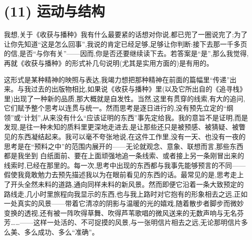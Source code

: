 \section{(11) 运动与结构}

我想,关于《收获与播种》我有什么最要紧的话想对你说,都已兜了一圈说完了;为了让你先知道“这是怎么回事”,我说的肯定已经足够,足够让你判断:接下去那一千多页的信,是否“与你有关”——因而,你是否还要继续读下去。若答案是“是”,那么我觉得,再就《收获与播种》的形式补几句说明(尤其是实用方面的)是有用的。

这形式是某种精神的映照与表达,我竭力想把那种精神在前面的篇幅里“传递”出来。与我过去的出版物相比,如果说《收获与播种》里(以及它所出自的《追寻栈》里)出现了一种新的品质,那大概就是自发性。当然,这里有贯穿的线索,有大的追问,它们赋予整个思考以连贯与统一。然而思考是逐日进行的,没有预先立定的“纲领”或“计划”,从来没有什么“应该证明的东西”事先定给我。我的意旨不是证明,而是发现,是往一种未知的质料里更深地走进去,是让那些还只是被预感、被猜疑、被瞥见的东西凝结起来。我可以毫不夸张地说,在这件工作里,没有一天、也没有一夜的思考是在“预料之中”的范围内展开的——无论就观念、意象、联想而言,那些东西都是我坐到
%
白纸面前、要在上面顽强地追一条线索、或者接上另一条刚冒出来的线索时,已经在那里的。每一次,思考中出现的东西都与我事先能够预言的不同——假使我竟敢勉力去预先描述我以为在眼前看见的东西的话。最常见的是,思考走上了开头全然未料的道路,通向同样未料的新风景。然而即便它沿着一条大致预定的路线走,几小时里旅程向我显示的东西,也与我上路时对它抱有的形象相去之远,正如一处真实的风景——带着它清凉的阴影与温暖的光的嬉戏,随着散步者脚步而微妙变换的透视,还有被一阵吹得草舞、吹得芦苇歌唱的微风送来的无数声响与无名芬芳……——这样一处活的、不可捉摸的风景,与一张明信片相去之远,无论那明信片多么美、多么成功、多么“准确”。

